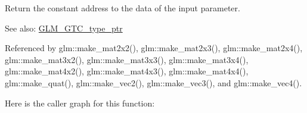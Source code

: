 Return the constant address to the data of the input parameter. \begin{Desc}
\item[See also:]\hyperlink{group__gtc__type__ptr}{GLM\_\-GTC\_\-type\_\-ptr} \end{Desc}


Referenced by glm::make\_\-mat2x2(), glm::make\_\-mat2x3(), glm::make\_\-mat2x4(), glm::make\_\-mat3x2(), glm::make\_\-mat3x3(), glm::make\_\-mat3x4(), glm::make\_\-mat4x2(), glm::make\_\-mat4x3(), glm::make\_\-mat4x4(), glm::make\_\-quat(), glm::make\_\-vec2(), glm::make\_\-vec3(), and glm::make\_\-vec4().

Here is the caller graph for this function: